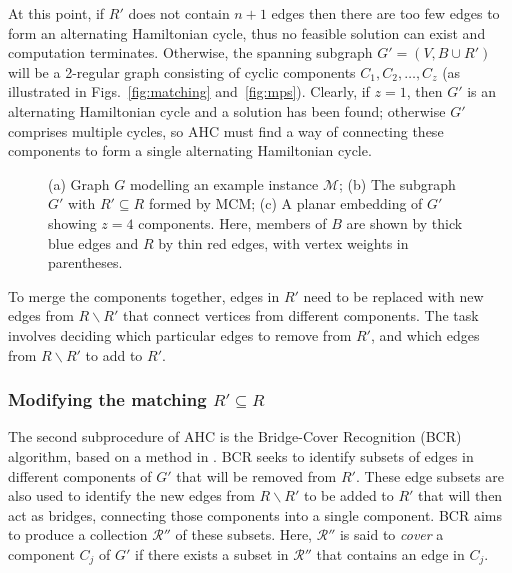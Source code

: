 \documentclass{IEEEtran}
\begin{document}
At this point, if $R'$ does not contain $n+1$ edges then there are too few edges to form an alternating Hamiltonian cycle, thus no feasible solution can exist and computation terminates. Otherwise, the spanning subgraph $G'=(V, B \cup R')$ will be a 2-regular graph consisting of cyclic components $C_1,C_2,\dotsc,C_z$ (as illustrated in Figs.~\ref{fig:matching} and~\ref{fig:mps}). Clearly, if $z = 1$, then $G'$ is an alternating Hamiltonian cycle and a solution has been found; otherwise $G'$ comprises multiple cycles, so AHC must find a way of connecting these components to form a single alternating Hamiltonian cycle.

\begin{figure}[h!]	
	\centering
	\subfloat[$G = (V, B \cup R)$]{
	\label{fig:threshold}}
	\hspace{5mm}
	\subfloat[$G' = (V, B \cup R')$]{
	\label{fig:matching}}
	\hspace{5mm}
	\caption{(a) Graph $G$ modelling an example instance $\mathcal{M}$; (b) The subgraph $G'$ with $R' \subseteq R$ formed by MCM; (c) A planar embedding of $G'$ showing $z = 4$ components. Here, members of $B$ are shown by thick blue edges and $R$ by thin red edges, with vertex weights in parentheses.}
	\label{fig:mcm}
\end{figure}

To merge the components together, edges in $R'$ need to be replaced with new edges from $R \backslash R'$ that connect vertices from different components. The task involves deciding which particular edges to remove from $R'$, and which edges from $R \backslash R'$ to add to $R'$.

\subsubsection{Modifying the matching $R' \subseteq R$}
\label{subsub:bcr}
The second subprocedure of AHC is the Bridge-Cover Recognition (BCR) algorithm, based on a method in \cite{becker2010}. BCR seeks to identify subsets of edges in different components of $G'$ that will be removed from $R'$. These edge subsets are also used to identify the new edges from $R \backslash R'$ to be added to $R'$ that will then act as bridges, connecting those components into a single component. BCR aims to produce a collection $\mathcal{R}''$ of these subsets. Here, $\mathcal{R}''$ is said to \emph{cover} a component $C_j$ of $G'$ if there exists a subset in $\mathcal{R}''$ that contains an edge in $C_j$.
\end{document}
